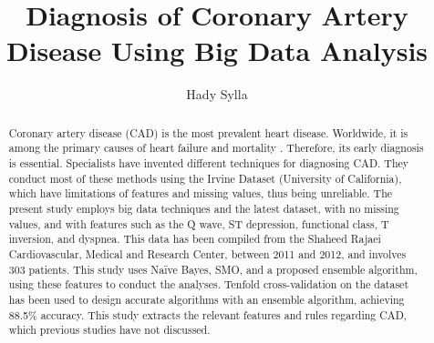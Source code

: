 \documentclass[sigconf]{acmart}
\begin{document}
\title{Diagnosis of Coronary Artery Disease Using Big Data Analysis}
\author{Hady Sylla}



\begin{abstract}
Coronary artery disease (CAD) is the most prevalent heart disease.
Worldwide, it is among the primary causes of heart failure and mortality \cite{ali}.
Therefore, its early diagnosis is essential.
Specialists have invented different techniques for diagnosing CAD.
They conduct most of these methods using the Irvine Dataset (University of California), which have limitations of features and missing values, thus being unreliable.
The present study employs big data techniques and the latest dataset, with no missing values, and with features such as the Q wave, ST depression, functional class, T inversion, and dyspnea.
This data has been compiled from the Shaheed Rajaei Cardiovascular, Medical and Research Center, between 2011 and 2012, and involves 303 patients.
This study uses Naïve Bayes, SMO, and a proposed ensemble algorithm, using these features to conduct the analyses.
Tenfold cross-validation on the dataset has been used to design accurate algorithms with an ensemble algorithm, achieving 88.5\% accuracy.
This study extracts the relevant features and rules regarding CAD, which previous studies have not discussed.

\end{abstract}


\maketitle
\end{document}
